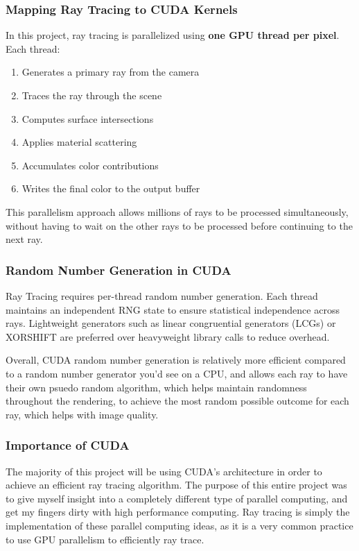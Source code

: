 \documentclass[11pt]{article}
\begin{document}
\subsubsection{Mapping Ray Tracing to CUDA Kernels}

In this project, ray tracing is parallelized using \textbf{one GPU thread per pixel}. Each thread:
\begin{enumerate}
    \item Generates a primary ray from the camera
    \item Traces the ray through the scene
    \item Computes surface intersections
    \item Applies material scattering
    \item Accumulates color contributions
    \item Writes the final color to the output buffer
\end{enumerate}

This parallelism approach allows millions of rays to be processed simultaneously, without having to wait on the other rays to be processed before continuing to the next ray.



\subsubsection{Random Number Generation in CUDA}

Ray Tracing requires per-thread random number generation. Each thread maintains an independent RNG state to ensure statistical independence across rays. Lightweight generators such as linear congruential generators (LCGs) or XORSHIFT are preferred over heavyweight library calls to reduce overhead.

Overall, CUDA random number generation is relatively more efficient compared to a random number generator you'd see on a CPU, and allows each ray to have their own psuedo random algorithm, which helps maintain randomness throughout the rendering, to achieve the most random possible outcome for each ray, which helps with image quality.


\subsubsection{Importance of CUDA}

The majority of this project will be using CUDA's architecture in order to achieve an efficient ray tracing algorithm. The purpose of this entire project was to give myself insight into a completely different type of parallel computing, and get my fingers dirty with high performance computing. Ray tracing is simply the implementation of these parallel computing ideas, as it is a very common practice to use GPU parallelism to efficiently ray trace. 
\end{document}
